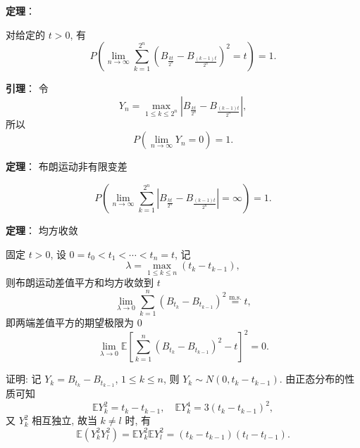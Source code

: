 \documentclass[openany]{ctexbook}
\theoremstyle{kaiti}
\theoremstyle{normal}
\begin{document}
\textbf{定理}：

对给定的 $t>0$, 有
\begin{equation}
  P\left(\lim_{n\to\infty}\sum_{k=1}^{2^n}\left(B_{\frac{kt}{2^n}}-B_{\frac{(k-1)t}{2^n}}\right)^2=t\right)=1.
\end{equation}

\textbf{引理}：
令 
\begin{equation}
  Y_n=\max_{1\leqslant k\leqslant2^n}\left|B_{\frac{kt}{2^n}}-B_{\frac{(k-1)t}{2^n}}\right|,
\end{equation}
所以
\begin{equation}
  P\left(\lim_{n\to\infty}Y_n=0\right)=1.
\end{equation}

\textbf{定理}： 布朗运动非有限变差

\begin{equation}
  P\left(\lim_{n\to\infty}\sum_{k=1}^{2^n}\left|B_{\frac{kt}{2^n}}-B_{\frac{(k-1)t}{2^n}}\right|=\infty\right)=1.
\end{equation}

\textbf{定理}： 均方收敛

固定 $t>0$, 设 $0=t_0<t_1<\cdots<t_n=t$, 记
\begin{equation}
  \lambda=\max_{1\leqslant k\leqslant n}(t_k-t_{k-1}),
\end{equation}
 则布朗运动差值平方和均方收敛到 $t$
\begin{equation}
  \lim_{\lambda\to0}\sum_{k=1}^n(B_{t_k}-B_{t_{k-1}})^2\overset{\text{m.s.}}{=}t,
\end{equation}
即两端差值平方的期望极限为 $0$
\begin{equation}
  \lim_{\lambda\to0}\mathbb{E}\left[\sum_{k=1}^n(B_{t_k}-B_{t_{k-1}})^2-t\right]^2=0.
\end{equation}

证明: 记 $Y_k=B_{t_k}-B_{t_{k-1}}$, $1\leqslant k\leqslant n$, 则 $Y_k\sim N(0,t_k-t_{k-1})$. 由正态分布的性质可知
\begin{equation}
  \mathbb{E}Y_k^2=t_k-t_{k-1},\quad \mathbb{E}Y_k^4=3(t_k-t_{k-1})^2,
\end{equation}
 又 $Y_k^2$ 相互独立, 故当 $k\neq l$ 时, 有
\begin{equation}
  \mathbb{E}(Y_k^2Y_l^2)=\mathbb{E}Y_k^2\mathbb{E}Y_l^2=(t_k-t_{k-1})(t_l-t_{l-1}).
\end{equation}
\end{document}
